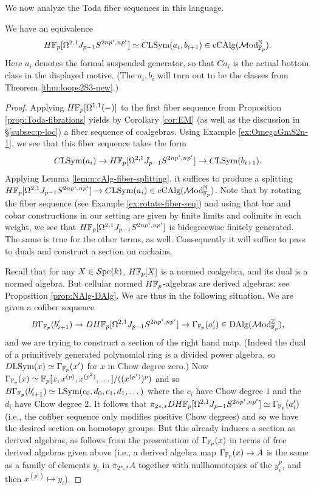 \documentclass{amsart}
\numberwithin{proposition}{section}
\numberwithin{equation}{section}
\def\LSym{\mathrm{LSym}}
\def\cCAlg{\mathrm{cCAlg}}
\def\DAlg{\mathrm{DAlg}}
\begin{document}
We now analyze the Toda fiber sequences in this language.
\begin{lemma} \label{lemm:identify-Jp-1}
We have an equivalence \[ H\F_p[\Omega^{2,1} J_{p-1} S^{2np^i,np^i}] \wequi C\LSym(a_i, b_{i+1}) \in \cCAlg(\Mod_{\F_p}^\N). \]
Here $a_i$ denotes the formal suspended generator, so that $Ca_i$ is the actual bottom class in the displayed motive.
(The $a_i, b_i$ will turn out to be the classes from Theorem \ref{thm:loops2S3-new}.)
\end{lemma}
\begin{proof}
Applying $H\mathbb{F}_p[\Omega^{1,1}(\mathord-)]$ to the first fiber sequence from Proposition \ref{prop:Toda-fibrations} yields by Corollary \ref{cor:EM} (as well as the discussion in \S\ref{subsec:p-loc}) a fiber sequence of coalgebras.
Using Example \ref{ex:OmegaGmS2n-1}, we see that this fiber sequence takes the form \[ C\LSym(a_i) \to H\F_p[\Omega^{2,1} J_{p-1} S^{2np^i,np^i}] \to C\LSym(b_{i+1}). \]
Applying Lemma \ref{lemm:cAlg-fiber-splitting}, it suffices to produce a splitting $H\F_p[\Omega^{2,1} J_{p-1} S^{2np^i,np^i}] \to C\LSym(a_i) \in \cCAlg(\Mod_{\F_p}^\N)$.
Note that by rotating the fiber sequence (see Example \ref{ex:rotate-fiber-seq}) and using that bar and cobar constructions in our setting are given by finite limits and colimits in each weight, we see that $H\mathbb{F}_p[\Omega^{2,1} J_{p-1} S^{2np^i,np^i}]$ is bidegreewise finitely generated.
The same is true for the other terms, as well.
Consequently it will suffice to pass to duals and construct a section on cochains.

Recall that for any $X \in \mathcal{S}\mathrm{pc}{}(k)$, $H\mathbb{F}_p[X]$ is a normed coalgebra, and its dual is a normed algebra.
But cellular normed $H\mathbb{F}_p$-algebras are derived algebras: see Proposition \ref{prop:NAlg-DAlg}.
We are thus in the following situation.
We are given a cofiber sequence \[ B\Gamma_{\F_p}(b_{i+1}') \to DH\F_p[\Omega^{2,1} J_{p-1} S^{2np^i,np^i}] \to \Gamma_{\F_p}(a_i') \in \DAlg(\Mod_{\F_p}^\Z), \] and we are trying to construct a section of the right hand map.
(Indeed the dual of a primitively generated polynomial ring is a divided power algebra, so $D\LSym(x) \wequi \Gamma_{\F_p}(x')$ for $x$ in Chow degree zero.)
Now $\Gamma_{\mathbb{F}_p}(x) \simeq \mathbb{F}_p[x, x^{(p)}, x^{(p^2)}, \dots]/((x^{(p^i)})^p)$ and so $B\Gamma_{\F_p}(b_{i+1}') \wequi \LSym(c_0, d_0, c_1, d_1, \dots)$ where the $c_i$ have Chow degree $1$ and the $d_i$ have Chow degree $2$.
It follows that $\pi_{2*,*} DH\mathbb{F}_p[\Omega^{2,1} J_{p-1} S^{2np^i,np^i}] \simeq \Gamma_{\mathbb{F}_p}(a_i')$ (i.e., the cofiber sequence only modifies positive Chow degrees) and so we have the desired section on homotopy groups.
But this already induces a section as derived algebras, as follows from the presentation of $\Gamma_{\mathbb{F}_p}(x)$ in terms of free derived algebras given above (i.e., a derived algebra map $\Gamma_{\mathbb{F}_p}(x) \to A$ is the same as a family of elements $y_i$ in $\pi_{2*,*} A$ together with nullhomotopies of the $y_i^p$, and then $x^{(p^i)} \mapsto y_i$).
\end{proof}
\end{document}
